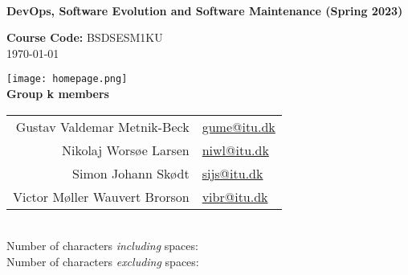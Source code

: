 \begin{titlepage}
    \begin{center}
        \\[0.5cm]
        
        \huge
        \textbf{DevOps, Software Evolution and Software Maintenance (Spring 2023)}\\
        \vspace{0.5cm}

        \Large
        \textbf{Course Code:} BSDSESM1KU\\[0.5cm]
        \large
        \today

        \texttt{[image: homepage.png]}\\

        \textbf{Group k members}\\[0.2cm]
        \begin{tabular}{r l}
            Gustav Valdemar Metnik-Beck   & \href{mailto:gume@itu.dk}{gume@itu.dk}\\
            Nikolaj Worsøe Larsen         & \href{mailto:niwl@itu.dk}{niwl@itu.dk}\\
            Simon Johann Skødt            & \href{mailto:sijs@itu.dk}{sijs@itu.dk}\\
            Victor Møller Wauvert Brorson & \href{mailto:vibr@itu.dk}{vibr@itu.dk}      
        \end{tabular}\\[0.8cm]
        
        \normalsize
        Number of characters \textit{including} spaces: \\
        Number of characters \textit{excluding} spaces: 
    \end{center}
\end{titlepage}